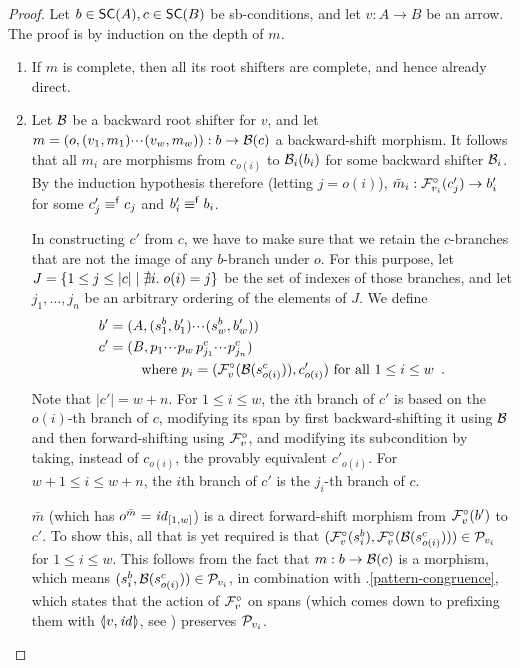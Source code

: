 \begin{proof}
Let $b\in \SC A,c\in \SC B$ be sb-conditions, and let $v:A\to B$ be an arrow. The proof is by induction on the depth of $m$.
\begin{enumerate}[topsep=\smallskipamount]
\item {}

\smallskip
If $m$ is complete, then all its root shifters are complete, and hence already direct.

\item Let $\mathcal{B}$ be a backward root shifter for $v$, and let $m=(o,(v_1,m_1){\cdotp\mkern-2mu\cdotp\mkern-2mu\cdotp\mkern1mu}(v_w,m_w)): b \rightarrow \mathcal{B}(c)$ a backward-shift morphism. It follows that all $m_i$ are morphisms from $c_{o(i)}$ to $\mathcal{B}_i(b_i)$ for some backward shifter $\mathcal{B}_i$. By the induction hypothesis therefore (letting $j=o(i)$), $\bar m_i:\mathcal{F}^\circ_{v_i}(c_j')\rightarrow b_i'$ for some $c_j'\equiv^{\mathsf f} c_j$ and $b'_i\equiv^{\mathsf f} b_i$.

\smallskip
In constructing $c'$ from $c$, we have to make sure that we retain the $c$-branches that are not the image of any $b$-branch under $o$. For this purpose, let $J=\{{1\leq j\leq |c|\mid \nexists i.\; o(i)=j}\}$ be the set of indexes of those branches, and let $j_1,\ldots,j_n$ be an arbitrary ordering of the elements of $J$. We define 
\begin{align*}
b'=\;&(A,(s^b_1,b'_1){\cdotp\mkern-2mu\cdotp\mkern-2mu\cdotp\mkern1mu} (s^b_w,b'_w)) \\
c'=\;&(B,p_1{\cdotp\mkern-2mu\cdotp\mkern-2mu\cdotp\mkern1mu} p_w\,p^c_{j_1}{\cdotp\mkern-2mu\cdotp\mkern-2mu\cdotp\mkern1mu} p^c_{j_n}) \\
   & \quad\text{where } p_i = (\mathcal{F}^\circ_{v}(\mathcal{B}(s^c_{o(i)})),c'_{o(i)}) \text{ for all $1\leq i\leq w$}\enspace.
\end{align*}
%
Note that $|c'|=w+n$. For $1\leq i\leq w$, the $i$th branch of $c'$ is based on the $o(i)$-th branch of $c$, modifying its span by first backward-shifting it using $\mathcal{B}$ and then forward-shifting using $\mathcal{F}^\circ_{v}$, and modifying its subcondition by taking, instead of $c_{o(i)}$, the provably equivalent $c'_{o(i)}$. For $w+1\leq i\leq w+n$, the $i$th branch of $c'$ is the $j_i$-th branch of $c$.

\smallskip
$\bar m$ (which has $o^{\bar m}=\mathit{id}_{[1,w]}$) is a direct forward-shift morphism from $\mathcal{F}^\circ_{v}(b')$ to $c'$. To show this, all that is yet required is that $(\mathcal{F}^\circ_{v}(s^b_i),\mathcal{F}^\circ_{v}(\mathcal{B}(s^c_{o(i)}))) \in \mathcal{P}_{v_i}$ for $1\leq i\leq w$. This follows from the fact that $m:b\rightarrow \mathcal{B}(c)$ is a morphism, which means $(s^b_i,\mathcal{B}(s^c_{o(i)}))\in \mathcal{P}_{v_i}$, in combination with .\ref{pattern-congruence}, which states that the action of $\mathcal{F}^\circ_{v}$ on spans (which comes down to prefixing them with $\spanof{v}{\id}$, see ) preserves $\mathcal{P}_{v_i}$.


\end{enumerate}
\end{proof}
